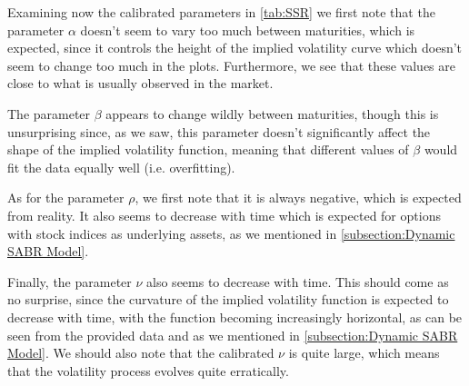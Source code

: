 Examining now the calibrated parameters in \autoref{tab:SSR} we first note that the parameter $\alpha$ doesn't seem to vary too much between maturities, which is expected, since it controls the height of the implied volatility curve which doesn't seem to change too much in the plots. Furthermore, we see that these values are close to what is usually observed in the market.


The parameter $\beta$ appears to change wildly between maturities, though this is unsurprising since, as we saw, this parameter doesn't significantly affect the shape of the implied volatility function, meaning that different values of $\beta$ would fit the data equally well (i.e. overfitting).

As for the parameter $\rho$, we first note that it is always negative, which is expected from reality. It also seems to decrease with time which is expected for options with stock indices as underlying assets, as we mentioned in \autoref{subsection:Dynamic SABR Model}.

Finally, the parameter $\nu$ also seems to decrease with time. This should come as no surprise, since the curvature of the implied volatility function is expected to decrease with time, with the function becoming increasingly horizontal, as can be seen from the provided data and as we mentioned in \autoref{subsection:Dynamic SABR Model}. We should also note that the calibrated $\nu$ is quite large, which means that the volatility process evolves quite erratically.



\vfill
\newpage

